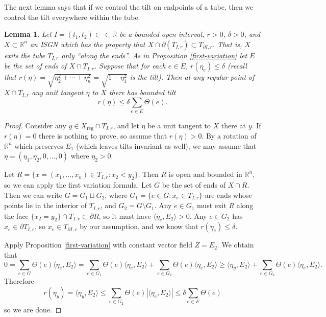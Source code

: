 \documentclass[10pt,a4paper]{amsart}
\newcommand{\reg}{\mathrm{reg}}
\newtheorem{lemma}{Lemma}
\begin{document}
The next lemma says that if we control the tilt on endpoints of a tube, then we control the tilt everywhere within the tube.

\begin{lemma} \label{brussel-sprout-lemma}
    Let $I = (t_1,t_2) \subset\subset \mathbb{R}$ be a bounded open interval, $r > 0$, $\delta > 0$, and $X \subset \mathbb{R}^n$ an ISGN which has the property that $X \cap \partial (T_{I,r}) \subset T_{\partial I, r}$. That is, $X$ exits the tube $T_{I,r}$ only ``along the ends''. As in Proposition \ref{first-variation} let $E$ be the set of ends of $X \cap T_{I,r}$. Suppose that for each $e \in E$, $r(\eta_e) \leq \delta$ (recall that $r(\eta) = \sqrt{\eta_2^2 + \cdots + \eta_n^2} = \sqrt{1 - \eta_1^2}$ is the tilt). Then at any regular point of $X \cap T_{I,r}$ any unit tangent $\eta$ to $X$ there has bounded tilt 
    \[r(\eta) \leq \delta \sum_{e \in E} \Theta(e).\]
\end{lemma}

\begin{proof}
Consider any $y \in X_\reg \cap T_{I,r}$, and let $\eta$ be a unit tangent to $X$ there at $y$. If $r(\eta) = 0$ there is nothing to prove, so assume that $r(\eta) > 0$. By a rotation of $\mathbb{R}^n$ which preserves $E_1$ (which leaves tilts invariant as well), we may assume that $\eta = (\eta_1,\eta_2,0,\ldots,0)$ where $\eta_2 > 0$. 

Let $R = \{x = (x_1,\ldots,x_n) \in T_{I,r}: x_2 < y_2\}$. Then $R$ is open and bounded in $\mathbb{R}^n$, so we can apply the first variation formula. Let $G$ be the set of ends of $X \cap R$. Then we can write $G = G_1 \sqcup G_2$, where $G_1 = \{e \in G: x_e \in T_{I,r}\}$ are ends whose points lie in the interior of $T_{I,r}$, and $G_2 = G \setminus G_1$. 
 Any $e \in G_1$ must exit $R$ along the face $\{x_2=y_2\} \cap T_{I,r} \subset \partial R$, so it must have $\langle \eta_e,E_2\rangle > 0$. Any $e \in G_2$ has $x_e \in \partial T_{I,r}$, so $x_e \in T_{\partial I,r}$ by our assumption, and we know that $r(\eta_e) \leq \delta$.
 
 Apply Proposition \ref{first-variation} with constant vector field $Z = E_2$.
We obtain that
\[0 = \sum_{e \in G} \Theta(e) \langle \eta_e,E_2\rangle = \sum_{e \in G_1} \Theta(e) \langle \eta_e ,E_2\rangle + \sum_{e \in G_2} \Theta(e) \langle \eta_e,E_2\rangle \geq \langle \eta_y,E_2 \rangle + \sum_{e \in G_2} \Theta(e)\langle \eta_e,E_2 \rangle. \]
Therefore
\[r(\eta_y) = \langle \eta_y,E_2\rangle \leq \sum_{e \in G_2} \Theta(e) | \langle \eta_e,E_2\rangle| \leq \delta \sum_{e \in E} \Theta(e) \]
so we are done.
\end{proof}
\end{document}
